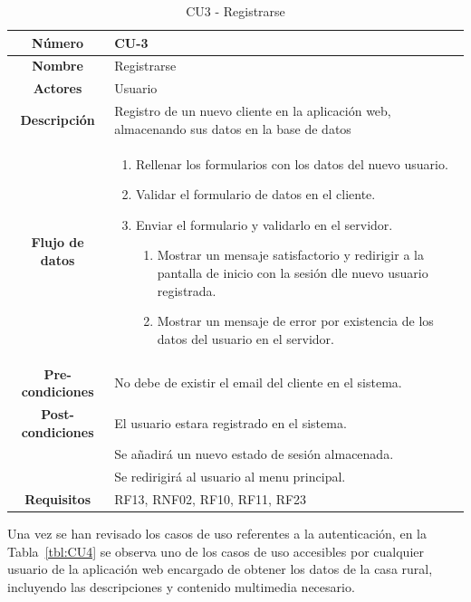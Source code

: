 \begin{table}[h!tb]
	\centering
	\begin{adjustbox}{width=1\textwidth}
	\begin{tabular}{|c|p{\textwidth}|}
		\hline {\bf Número} & CU-3 \\
		\hline {\bf Nombre} & Registrarse\\
		\hline {\bf Actores} & Usuario \\
		\hline {\bf Descripción} & Registro de un nuevo cliente en la aplicación web, almacenando sus datos en la base de datos \\
		\hline {\bf Flujo de datos}
		& 
		\begin{enumerate}
			\item Rellenar los formularios con los datos del nuevo usuario.
            \item Validar el formulario de datos en el cliente.
            \item Enviar el formulario y validarlo en el servidor.
            \begin{enumerate}
                \item Mostrar un mensaje satisfactorio y redirigir a la pantalla de inicio con la sesión dle nuevo usuario registrada.
                \item Mostrar un mensaje de error por existencia de los datos del usuario en el servidor.
            \end{enumerate}
        \end{enumerate}\\
		\hline {\bf Pre-condiciones}
		& No debe de existir el email del cliente en el sistema. \\
		\hline {\bf Post-condiciones}
		& El usuario estara registrado en el sistema. \\
        & Se añadirá un nuevo estado de sesión almacenada. \\
        & Se redirigirá al usuario al menu principal. \\
		\hline {\bf Requisitos} & RF13, RNF02, RF10, RF11, RF23 \\
		\hline 
	\end{tabular}
	\end{adjustbox}
	\caption{CU3 - Registrarse\label{tbl:CU3}}
\end{table}
Una vez se han revisado los casos de uso referentes a la autenticación, en la Tabla~\ref{tbl:CU4} se observa uno de los casos de uso accesibles por cualquier usuario de la aplicación web encargado de obtener los datos de la casa rural, incluyendo las descripciones y contenido multimedia necesario.
